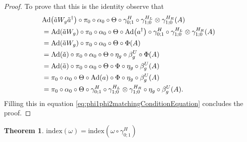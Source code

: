 \documentclass[12pt,a4paper,twoside]{article}
\let\originalleft\left
\let\originalright\right
\renewcommand{\left}{\mathopen{}\mathclose\bgroup\originalleft}
\renewcommand{\right}{\aftergroup\egroup\originalright}
\newcommand{\Ad}[1]{\textrm{Ad}\left(#1\right)}
\theoremstyle{definition}
\newtheorem{theorem}{Theorem}[section]
\numberwithin{equation}{section}
\begin{document}
\begin{proof}
	To prove that this is the identity observe that
	\begin{align}
		&\Ad{\tilde{a}W_g\tilde{a}^\dagger}\circ\pi_0\circ\alpha_0\circ\Theta\circ \gamma^{H}_{0;1}\circ\gamma^{H_L}_{1;0}\otimes\gamma^{H_R}_{1;0}(A)\\
		&=\Ad{\tilde{a}W_g}\circ\pi_0\circ\alpha_0\circ\Theta\circ\Ad{a^\dagger}\circ \gamma^{H}_{0;1}\circ\gamma^{H_L}_{1;0}\otimes\gamma^{H_R}_{1;0}(A)\\
		&=\Ad{\tilde{a}W_g}\circ\pi_0\circ\alpha_0\circ\Theta\circ\Phi(A)\\
		&=\Ad{\tilde{a}}\circ\pi_0\circ\alpha_0\circ\Theta\circ\eta_g\circ\beta_g^U\circ\Phi(A)\\
		&=\Ad{\tilde{a}}\circ\pi_0\circ\alpha_0\circ\Theta\circ\Phi\circ\eta_g\circ\beta_g^U(A)\\
		&=\pi_0\circ\alpha_0\circ\Theta\circ\Ad{a}\circ\Phi\circ\eta_g\circ\beta_g^U(A)\\
		&=\pi_0\circ\alpha_0\circ\Theta\circ \gamma^{H}_{0;1}\circ\gamma^{H_L}_{1;0}\otimes\gamma^{H_R}_{1;0} \circ\eta_g\circ\beta_g^U(A).
	\end{align}
	Filling this in equation \eqref{eq:phi1phi2matchingConditionEquation} concludes the proof.
\end{proof}
\begin{theorem}\label{thrm:IndexInvariantUnderLGA}
	$\textrm{index}(\omega)=\textrm{index}(\omega\circ\gamma^H_{0;1})$
\end{theorem}
\end{document}
